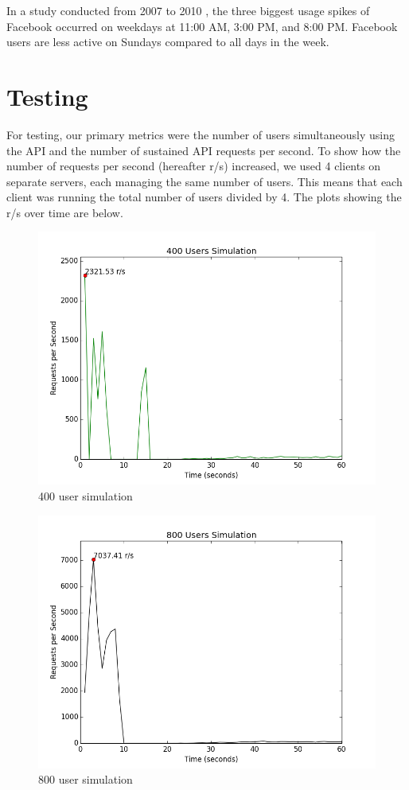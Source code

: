 \documentclass{article}
\begin{document}
\noindent In a study conducted from 2007 to 2010 \cite{fbstats2website}, the three biggest usage spikes of Facebook occurred on weekdays at 11:00 AM, 3:00 PM, and 8:00 PM. Facebook users are less active on Sundays compared to all days in the week.

\section*{Testing}
For testing, our primary metrics were the number of users simultaneously using the API and the number of sustained API requests per second. To show how the number of requests per second (hereafter r/s) increased, we used 4 clients on separate servers, each managing the same number of users. This means that each client was running the total number of users divided by 4. The plots showing the r/s over time are below.

\begin{figure}[H]
  \centering
  \includegraphics[scale=0.5]{diagrams/rps-400.png}
  \caption{400 user simulation}
\end{figure}

\begin{figure}[H]
  \centering
  \includegraphics[scale=0.5]{diagrams/rps-800.png}
  \caption{800 user simulation}
\end{figure}
\end{document}
